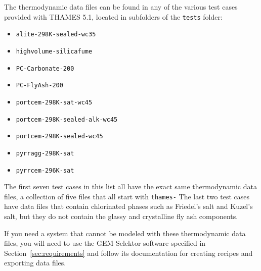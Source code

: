 \documentclass{article}
\begin{document}
The thermodynamic data files can be found in any of the various test cases
provided with THAMES 5.1, located in subfolders of the \verb!tests! folder:
\begin{itemize}
	\item \verb!alite-298K-sealed-wc35!
	\item \verb!highvolume-silicafume!
	\item \verb!PC-Carbonate-200!
	\item \verb!PC-FlyAsh-200!
	\item \verb!portcem-298K-sat-wc45!
	\item \verb!portcem-298K-sealed-alk-wc45!
	\item \verb!portcem-298K-sealed-wc45!
	\item \verb!pyrragg-298K-sat!
	\item \verb!pyrrcem-296K-sat!
\end{itemize}
The first seven test cases in this list all have the exact same thermodynamic
data files, a collection of five files that all start with \verb!thames-!
The last two test cases have data files that contain chlorinated phases such
as Friedel's salt and Kuzel's salt, but they do not contain the glassy and
crystalline fly ash components.

If you need a system that cannot be modeled with these thermodynamic
data files, you will need to use the GEM-Selektor software specified in
Section~\ref{sec:requirements} and follow its documentation for creating
recipes and exporting data files.

\normalsize{ }
\end{document}
